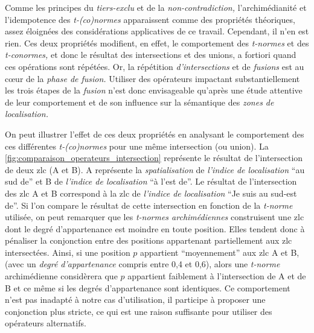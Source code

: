 Comme les principes du \emph{tiers-exclu} et de la
\emph{non-contradiction,} l'archimédianité et l'idempotence des
\emph{t-(co)normes} apparaissent comme des propriétés théoriques,
assez éloignées des considérations applicatives de ce
travail. Cependant, il n'en est rien. Ces deux propriétés modifient,
en effet, le comportement des \emph{t-normes} et des
\emph{t-conormes,} et donc le résultat des intersections et des
unions, a fortiori quand ces opérations sont répétées. Or, la
répétition \emph{d'intersections} et de \emph{fusions} est au cœur de
la \emph{phase de fusion.} Utiliser des opérateurs impactant
substantiellement les trois étapes de la \emph{fusion} n'est donc
envisageable qu'après une étude attentive de leur comportement et de
son influence sur la sémantique des \emph{zones de localisation.}

On peut illustrer l'effet de ces deux propriétés en analysant le
comportement des ces différentes \emph{t-(co)normes} pour une même
intersection (ou union). La
\autoref{fig:comparaison_operateurs_intersection} représente le
résultat de l'intersection de deux \ac{zlc}
(\textcolor{RdBu-9-1}{\textsf{A}} et
\textcolor{RdBu-9-9}{\textsf{B}}). \textcolor{RdBu-9-1}{\textsf{A}}
représente la \emph{spatialisation} de \emph{l'indice de localisation}
\enquote{au sud de} et \textcolor{RdBu-9-9}{\textsf{B}} de
\emph{l'indice de localisation} \enquote{à l'est de}. Le résultat de
l'intersection des \ac{zlc} \textcolor{RdBu-9-1}{\textsf{A}} et
\textcolor{RdBu-9-9}{\textsf{B}} correspond à la \ac{zlc} de
\emph{l'indice de localisation} \enquote{Je suis au sud-est de}. Si
l'on compare le résultat de cette intersection en fonction de la
\emph{t-norme} utilisée, on peut remarquer que les \emph{t-normes
  archimédiennes} construisent une \ac{zlc} dont le degré
d'appartenance est moindre en toute position. Elles tendent donc à
pénaliser la conjonction entre des positions appartenant partiellement
aux \ac{zlc} intersectées. Ainsi, si une position \(p\) appartient
\enquote{moyennement} aux \ac{zlc} \textcolor{RdBu-9-1}{\textsf{A}} et
\textcolor{RdBu-9-9}{\textsf{B}}, (\eg avec un \emph{degré
  d’appartenance} compris entre 0,4 et 0,6), alors une \emph{t-norme}
archimédienne considèrera que \(p\) appartient faiblement à
l'intersection de \textcolor{RdBu-9-1}{\textsf{A}} et de
\textcolor{RdBu-9-9}{\textsf{B}} et ce même si les degrés
d'appartenance sont identiques.
%
Ce comportement n'est pas
inadapté à notre cas d'utilisation, il participe à proposer une
conjonction plus stricte, ce qui est une raison suffisante pour
utiliser des opérateurs alternatifs.

